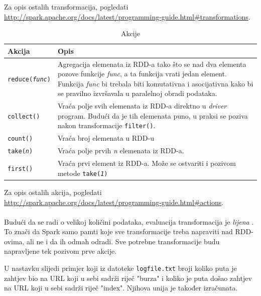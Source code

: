 \documentclass[times, utf8, zavrsni]{fer}
\begin{document}
Za opis ostalih transformacija, pogledati \url{http://spark.apache.org/docs/latest/programming-guide.html#transformations}.
\newpage
\begin{table}[htb]
\caption{Akcije}
\label{tbl:akcije}
\centering
\begin{tabular}{lp{8cm}} 
\hline
Akcija & Opis \\
\hline
\texttt{reduce(\emph{func})} & Agregacija elemenata iz RDD-a tako što se nad dva elementa pozove funkcije \emph{func}, a ta funkcija vrati jedan element. Funkcija \emph{func} bi trebala biti komutativna i asocijativna kako bi se pravilno izvršavala u paralelnoj obradi podataka.\\
\texttt{collect()} & Vraća polje svih elemenata iz RDD-a direktno u \emph{driver} program. Budući da je tih elemenata puno, u praksi se poziva nakon transformacije \texttt{filter()}. \\
\texttt{count()} & Vraća broj elemenata u RDD-u \\
\texttt{take(\emph{n})} & Vraća polje prvih \emph{n} elemenata iz RDD-a. \\
\texttt{first()} & Vraća prvi element iz RDD-a. Može se ostvariti i pozivom metode  \texttt{take(\emph{1})}\\
\hline
\end{tabular}
\end{table}
Za opis ostalih akcija, pogledati \url{http://spark.apache.org/docs/latest/programming-guide.html#actions}.
\\
\\
Budući da se radi o velikoj količini podataka, evaluacija transformacija je \emph{lijena} . To znači da Spark samo pamti koje sve transformacije treba napraviti nad RDD-ovima, ali ne i da ih odmah odradi. Sve potrebne transformacije budu napravljene tek pozivom prve akcije. 

U nastavku slijedi primjer koji iz datoteke \texttt{logfile.txt} broji koliko puta je zahtjev bio na URL koji u sebi sadrži riječ "burza" i koliko je puta došao zahtjev na URL koji u sebi sadrži riječ "index". Njihova unija je također izračunata.
 
\end{document}
